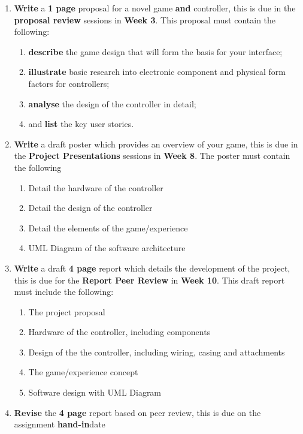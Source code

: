 \documentclass{../../fal_assignment}
\begin{document}
\begin{enumerate}[label=(\Alph*)]
    \item \textbf{Write} a \textbf{1 page} proposal for a novel game \textbf{and} controller, this is due in the \textbf{proposal review} sessions in \textbf{Week 3}. This proposal must contain the following:
    	\begin{enumerate}[label=\roman*.]
    		\item \textbf{describe} the game design that will form the basis for your interface;
    		\item \textbf{illustrate} basic  research into electronic component and physical form factors for controllers;
			\item \textbf{analyse} the design of the controller in detail;
			\item and \textbf{list} the key user stories.
		\end{enumerate}
	\item \textbf{Write} a draft poster which provides an overview of your game, this is due in the \textbf{Project Presentations} sessions in \textbf{Week 8}. The poster must contain the following
		\begin{enumerate}[label=\roman*.]
			\item Detail the hardware of the controller
			\item Detail the design of the controller
			\item Detail the elements of the game/experience
			\item UML Diagram of the software architecture
		\end{enumerate}
	\item \textbf{Write} a draft \textbf{4 page} report which details the development of the project, this is due for the \textbf{Report Peer Review} in \textbf{Week 10}. This draft report must include the following:
		\begin{enumerate}[label=\roman*.]
			\item The project proposal
			\item Hardware of the controller, including components
			\item Design of the the controller, including wiring, casing and attachments
			\item The game/experience concept
			\item Software design with UML Diagram
		\end{enumerate}
	\item \textbf{Revise} the \textbf{4 page} report based on peer review, this is due on the assignment \textbf{hand-in}date
\end{enumerate}
\end{document}
